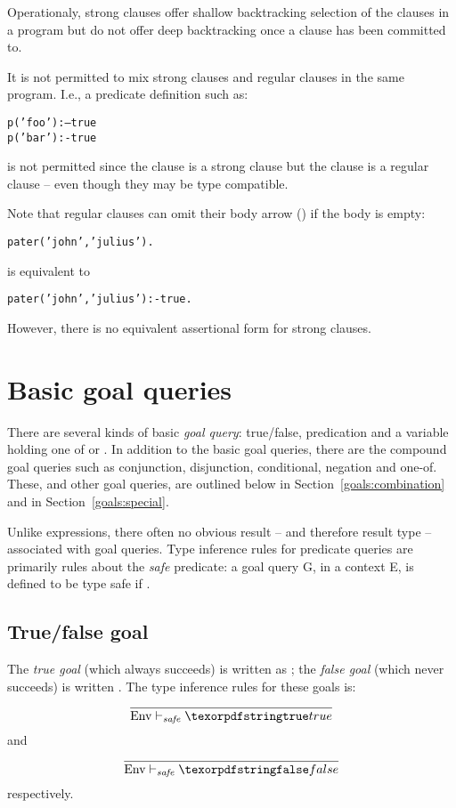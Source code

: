 Operationaly, strong clauses offer shallow backtracking selection of the clauses in a program but do not offer deep backtracking once a clause has been committed to.

It is not permitted to mix strong clauses and regular clauses in the same program. I.e., a predicate definition such as:
\begin{alltt}
p('foo') :-- true
p('bar') :- true
\end{alltt}
is not permitted since the  clause is a strong clause but the  clause is a regular clause -- even though they may be type compatible.

Note that regular clauses can omit their body arrow (\q{:-}) if the body is empty:
\begin{alltt}
pater('john','julius').
\end{alltt}
is equivalent to
\begin{alltt}
pater('john','julius') :- true.
\end{alltt}
However, there is no equivalent assertional form for strong clauses. 


\section{Basic goal queries}
\label{goal:basic}

There are several kinds of basic \emph{goal query}: true/false, predication and a  variable holding one of  or . In addition to the basic goal queries, there are the compound goal queries such as conjunction, disjunction, conditional, negation and one-of. These, and other goal queries, are outlined below in Section~\vref{goals:combination} and in Section~\vref{goals:special}.

Unlike expressions, there often no obvious result -- and therefore result type -- associated with goal queries. Type inference rules for predicate queries are primarily rules about the \emph{safe} predicate: a goal query G, in a context E, is defined to be type safe if .

\subsection{True/false goal}
The \emph{true goal} (which always succeeds) is written as ; the \emph{false goal} (which never succeeds) is written . The type inference rules for these goals is:
\begin{equation}
\frac{}
{\safegoal{\emph{Env}}{\q{true}}}
\end{equation}
and
\begin{equation}
\frac{}
{\safegoal{\emph{Env}}{\q{false}}}
\end{equation}
respectively.

